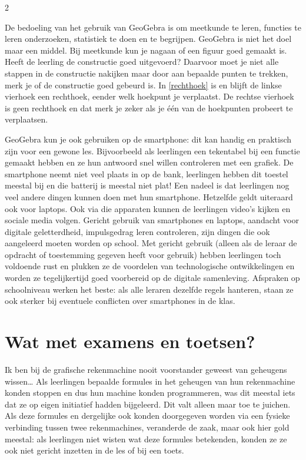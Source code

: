 \begin{multicols}{2}

De bedoeling van het gebruik van GeoGebra is om meetkunde te leren, functies te leren onderzoeken, statistiek te doen en te begrijpen. GeoGebra is niet het doel maar een middel. 
Bij meetkunde kun je nagaan of een figuur goed gemaakt is. Heeft de leerling de constructie goed uitgevoerd? Daarvoor moet je niet alle stappen in de constructie nakijken maar door aan bepaalde punten te trekken, merk je of de constructie goed gebeurd is. In \autoref{rechthoek} is en blijft de linkse vierhoek een rechthoek, eender welk hoekpunt je verplaatst. De rechtse vierhoek is geen rechthoek en dat merk je zeker als je één van de hoekpunten probeert te verplaatsen.


GeoGebra kun je ook gebruiken op de smartphone: dit kan  handig en praktisch zijn voor een gewone les. Bijvoorbeeld als leerlingen een tekentabel bij een functie gemaakt hebben en ze hun antwoord snel willen controleren met een grafiek. De smartphone neemt niet veel plaats in op de bank, leerlingen hebben dit toestel meestal bij en die batterij is meestal niet plat! 
Een nadeel is dat leerlingen nog veel andere dingen kunnen doen met hun smartphone. Hetzelfde geldt uiteraard ook voor laptops. Ook via die apparaten kunnen de leerlingen video’s kijken en sociale media volgen. Gericht gebruik van smartphones en laptops, aandacht voor digitale geletterdheid, impulsgedrag leren controleren, zijn dingen die ook aangeleerd moeten worden op school. Met gericht gebruik (alleen als de leraar de opdracht of toestemming gegeven heeft voor gebruik) hebben leerlingen toch voldoende rust en plukken ze de voordelen van technologische ontwikkelingen en worden ze tegelijkertijd goed voorbereid op de digitale samenleving. Afspraken op schoolniveau werken het beste: als alle leraren dezelfde regels hanteren, staan ze ook sterker bij eventuele conflicten over smartphones in de klas.

	\section{Wat met examens en toetsen?}
Ik ben bij de grafische rekenmachine nooit voorstander geweest van geheugens wissen… Als leerlingen bepaalde formules in het geheugen van hun rekenmachine konden stoppen en dus hun machine konden programmeren, was dit meestal iets dat ze op eigen initiatief hadden bijgeleerd. Dit valt alleen maar toe te juichen. Als deze formules en dergelijke ook konden doorgegeven worden via een fysieke verbinding tussen twee rekenmachines, veranderde de zaak, maar ook hier gold meestal: als leerlingen niet wisten wat deze formules betekenden, konden ze ze ook niet gericht inzetten in de les of bij een toets.


\end{multicols}
